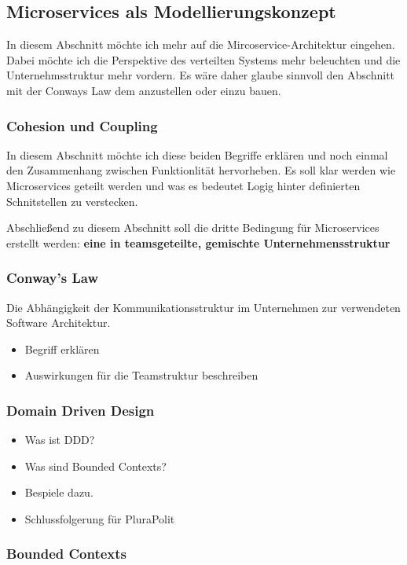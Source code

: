 \subsection{Microservices als Modellierungskonzept}

In diesem Abschnitt möchte ich mehr auf die Mircoservice-Architektur eingehen. Dabei möchte ich die Perspektive des verteilten Systems mehr beleuchten und die Unternehmsstruktur mehr vordern. Es wäre daher glaube sinnvoll den Abschnitt mit der Conways Law dem anzustellen oder einzu bauen.

\subsubsection{Cohesion und Coupling}

In diesem Abschnitt möchte ich diese beiden Begriffe erklären und noch einmal den Zusammenhang zwischen Funktionlität hervorheben. Es soll klar werden wie Microservices geteilt werden und was es bedeutet Logig hinter definierten Schnitstellen zu verstecken.

Abschließend zu diesem Abschnitt soll die dritte Bedingung für Microservices erstellt werden: \textbf{eine in teamsgeteilte, gemischte Unternehmensstruktur}

\subsubsection{Conway's Law}

Die Abhängigkeit der Kommunikationsstruktur im Unternehmen zur verwendeten Software Architektur.

\begin{itemize}
	\item Begriff erklären
	\item Auswirkungen für die Teamstruktur beschreiben
\end{itemize}

\subsubsection{Domain Driven Design}

\begin{itemize}
	\item Was ist DDD?
	\item Was sind Bounded Contexts?
	\item 	Bespiele dazu.
	\item Schlussfolgerung für PluraPolit
\end{itemize}

\subsubsection{Bounded Contexts}
